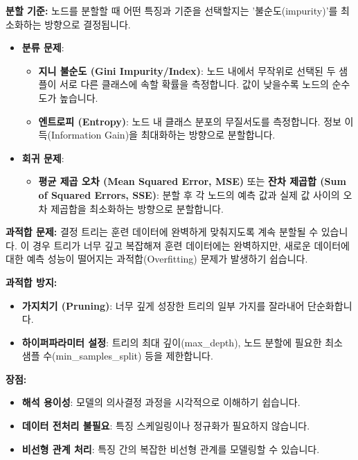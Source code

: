 \documentclass[11pt,a4paper]{article}
\begin{document}
\textbf{분할 기준:}
노드를 분할할 때 어떤 특징과 기준을 선택할지는 '불순도(impurity)'를 최소화하는 방향으로 결정됩니다.
\begin{itemize}
    \item \textbf{분류 문제}:
        \begin{itemize}
            \item \textbf{지니 불순도 (Gini Impurity/Index)}: 노드 내에서 무작위로 선택된 두 샘플이 서로 다른 클래스에 속할 확률을 측정합니다. 값이 낮을수록 노드의 순수도가 높습니다.
            \item \textbf{엔트로피 (Entropy)}: 노드 내 클래스 분포의 무질서도를 측정합니다. 정보 이득(Information Gain)을 최대화하는 방향으로 분할합니다.
        \end{itemize}
    \item \textbf{회귀 문제}:
        \begin{itemize}
            \item \textbf{평균 제곱 오차 (Mean Squared Error, MSE)} 또는 \textbf{잔차 제곱합 (Sum of Squared Errors, SSE)}: 분할 후 각 노드의 예측 값과 실제 값 사이의 오차 제곱합을 최소화하는 방향으로 분할합니다.
        \end{itemize}
\end{itemize}

\textbf{과적합 문제:}
결정 트리는 훈련 데이터에 완벽하게 맞춰지도록 계속 분할될 수 있습니다. 이 경우 트리가 너무 깊고 복잡해져 훈련 데이터에는 완벽하지만, 새로운 데이터에 대한 예측 성능이 떨어지는 과적합(Overfitting) 문제가 발생하기 쉽습니다.

\textbf{과적합 방지:}
\begin{itemize}
    \item \textbf{가지치기 (Pruning)}: 너무 깊게 성장한 트리의 일부 가지를 잘라내어 단순화합니다.
    \item \textbf{하이퍼파라미터 설정}: 트리의 최대 깊이(max\_depth), 노드 분할에 필요한 최소 샘플 수(min\_samples\_split) 등을 제한합니다.
\end{itemize}

\textbf{장점:}
\begin{itemize}
    \item \textbf{해석 용이성}: 모델의 의사결정 과정을 시각적으로 이해하기 쉽습니다.
    \item \textbf{데이터 전처리 불필요}: 특징 스케일링이나 정규화가 필요하지 않습니다.
    \item \textbf{비선형 관계 처리}: 특징 간의 복잡한 비선형 관계를 모델링할 수 있습니다.
\end{itemize}
\end{document}
